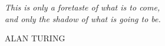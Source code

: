 \null\newpage

\thispagestyle{empty}
\null\vfill

\newlength\longest
\settowidth{}
\centering
\parbox{\longest}{%
  \raggedright{\Large\itshape%
  This is only a foretaste of what is to come, \\
  and only the shadow of what is going to be.\par\bigskip
  }   
  \raggedleft\large\MakeUppercase{Alan Turing}\par%
}

\vfill\vfill

\newpage
\setcounter{page}{0}
\tableofcontents
\newpage